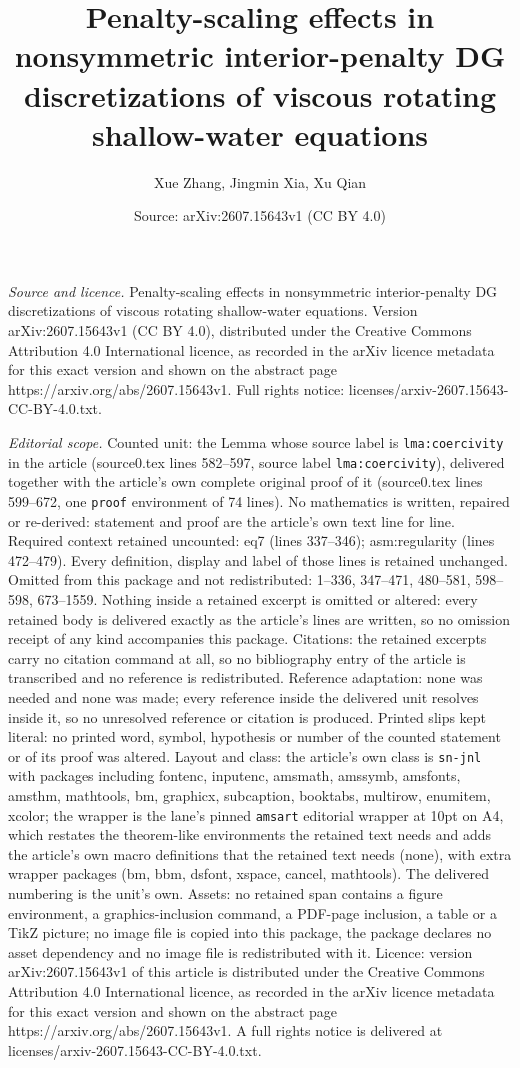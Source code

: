 \documentclass[10pt,a4paper]{amsart}
\title[Penalty-scaling effects in nonsymmetric interior-penalty DG ]{Penalty-scaling effects in nonsymmetric interior-penalty DG discretizations of viscous rotating shallow-water equations}
\author{Xue Zhang, Jingmin Xia, Xu Qian}
\date{Source: arXiv:2607.15643v1 (CC BY 4.0)}
\begin{document}
\maketitle

\noindent\emph{Source and licence.} Penalty-scaling effects in nonsymmetric interior-penalty DG discretizations of viscous rotating shallow-water equations. Version arXiv:2607.15643v1 (CC BY 4.0), distributed under the Creative Commons Attribution 4.0 International licence, as recorded in the arXiv licence metadata for this exact version and shown on the abstract page https://arxiv.org/abs/2607.15643v1. Full rights notice: licenses/arxiv-2607.15643-CC-BY-4.0.txt.\par\smallskip

\noindent\textit{Editorial scope.} Counted unit: the Lemma whose source label is \texttt{lma:coercivity} in the article (source0.tex lines 582--597, source label \texttt{lma:coercivity}), delivered together with the article's own complete original proof of it (source0.tex lines 599--672, one \texttt{proof} environment of 74 lines). No mathematics is written, repaired or re-derived: statement and proof are the article's own text line for line. Required context retained uncounted: eq7 (lines 337--346); asm:regularity (lines 472--479). Every definition, display and label of those lines is retained unchanged. Omitted from this package and not redistributed: 1--336, 347--471, 480--581, 598--598, 673--1559. Nothing inside a retained excerpt is omitted or altered: every retained body is delivered exactly as the article's lines are written, so no omission receipt of any kind accompanies this package. Citations: the retained excerpts carry no citation command at all, so no bibliography entry of the article is transcribed and no reference is redistributed. Reference adaptation: none was needed and none was made; every reference inside the delivered unit resolves inside it, so no unresolved reference or citation is produced. Printed slips kept literal: no printed word, symbol, hypothesis or number of the counted statement or of its proof was altered. Layout and class: the article's own class is \texttt{sn-jnl} with packages including fontenc, inputenc, amsmath, amssymb, amsfonts, amsthm, mathtools, bm, graphicx, subcaption, booktabs, multirow, enumitem, xcolor; the wrapper is the lane's pinned \texttt{amsart} editorial wrapper at 10pt on A4, which restates the theorem-like environments the retained text needs and adds the article's own macro definitions that the retained text needs (none), with extra wrapper packages (bm, bbm, dsfont, xspace, cancel, mathtools). The delivered numbering is the unit's own. Assets: no retained span contains a figure environment, a graphics-inclusion command, a PDF-page inclusion, a table or a TikZ picture; no image file is copied into this package, the package declares no asset dependency and no image file is redistributed with it. Licence: version arXiv:2607.15643v1 of this article is distributed under the Creative Commons Attribution 4.0 International licence, as recorded in the arXiv licence metadata for this exact version and shown on the abstract page https://arxiv.org/abs/2607.15643v1. A full rights notice is delivered at licenses/arxiv-2607.15643-CC-BY-4.0.txt. 
\end{document}
